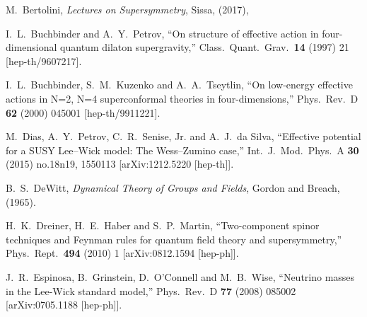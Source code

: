 \begin{thebibliography}{99}
  
  
   M.~Bertolini, {\em Lectures on Supersymmetry}, Sissa,
(2017), 
  
  
  I.~L.~Buchbinder and A.~Y.~Petrov,
  ``On structure of effective action in four-dimensional quantum dilaton supergravity,''
  Class.\ Quant.\ Grav.\  {\bf 14} (1997) 21
  [hep-th/9607217].
  
  I.~L.~Buchbinder, S.~M.~Kuzenko and A.~A.~Tseytlin,
  ``On low-energy effective actions in N=2, N=4 superconformal theories in four-dimensions,''
  Phys.\ Rev.\ D {\bf 62} (2000) 045001
  [hep-th/9911221].

  








  M.~Dias, A.~Y.~Petrov, C.~R.~Senise, Jr. and A.~J.~da Silva,
  ``Effective potential for a SUSY Lee–Wick model: The Wess–Zumino case,''
  Int.\ J.\ Mod.\ Phys.\ A {\bf 30} (2015) no.18n19,  1550113
  [arXiv:1212.5220 [hep-th]].



B.~S.~DeWitt,   {\em Dynamical Theory of Groups and Fields}, Gordon and Breach, (1965). 

  H.~K.~Dreiner, H.~E.~Haber and S.~P.~Martin,
  ``Two-component spinor techniques and Feynman rules for quantum field theory and supersymmetry,''
  Phys.\ Rept.\  {\bf 494} (2010) 1
  [arXiv:0812.1594 [hep-ph]].




  
  J.~R.~Espinosa, B.~Grinstein, D.~O'Connell and M.~B.~Wise,
  ``Neutrino masses in the Lee-Wick standard model,''
  Phys.\ Rev.\ D {\bf 77} (2008) 085002
  [arXiv:0705.1188 [hep-ph]].



\end{thebibliography}
